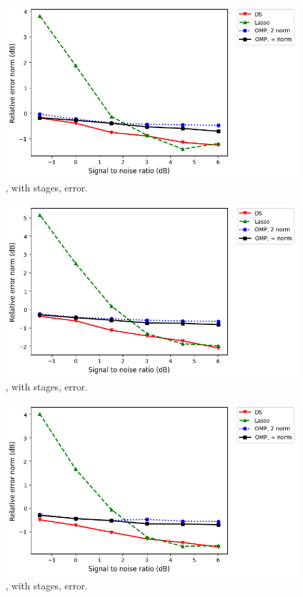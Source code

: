 %
\begin {figure} [H]
\includegraphics [width = 0.8 \textwidth] {error-small-more-tall-six-usual.png}
\caption {, with  stages, error.}
\end {figure}
%
\begin {figure} [H]
\includegraphics [width = 0.8 \textwidth] {error-medium-more-square-six-usual.png}
\caption {, with  stages, error.}
\end {figure}
%
\begin {figure} [H]
\includegraphics [width = 0.8 \textwidth] {error-medium-more-wide-six-usual.png}
\caption {, with  stages, error.}
\end {figure}
